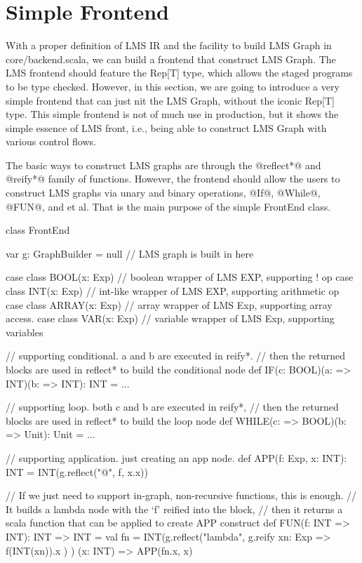 \section{Simple Frontend}\label{sec:s_front}

With a proper definition of LMS IR and the facility to build LMS Graph in core/backend.scala,
we can build a frontend that construct LMS Graph. The LMS frontend should feature the Rep[T]
type, which allows the staged programs to be type checked. However, in this section, we are
going to introduce a very simple frontend that can just nit the LMS Graph, without the iconic
Rep[T] type. This simple frontend is not of much use in production, but it shows the simple
essence of LMS front, i.e., being able to construct LMS Graph with various control flows.

The basic ways to construct LMS graphs are through the @reflect*@ and @reify*@ family of
functions. However, the frontend should allow the users to construct LMS graphs via unary
and binary operations, @If@, @While@, @FUN@, and et al. That is the main purpose of the
simple FrontEnd class.

\begin{listing}[scala]
class FrontEnd {

    var g: GraphBuilder = null // LMS graph is built in here

    case class BOOL(x: Exp) // boolean wrapper of LMS EXP, supporting ! op
    case class INT(x: Exp)  // int-like wrapper of LMS EXP, supporting arithmetic op
    case class ARRAY(x: Exp) // array wrapper of LMS Exp, supporting array access.
    case class VAR(x: Exp) // variable wrapper of LMS Exp, supporting variables

    // supporting conditional. a and b are executed in reify*.
    // then the returned blocks are used in reflect* to build the conditional node
    def IF(c: BOOL)(a: => INT)(b: => INT): INT = {...}

    // supporting loop. both c and b are executed in reify*,
    // then the returned blocks are used in reflect* to build the loop node
    def WHILE(c: => BOOL)(b: => Unit): Unit = {...}

    // supporting application. just creating an app node.
    def APP(f: Exp, x: INT): INT = INT(g.reflect("@", f, x.x))

    // If we just need to support in-graph, non-recursive functions, this is enough.
    // It builds a lambda node with the `f' reified into the block,
    // then it returns a scala function that can be applied to create APP construct
    def FUN(f: INT => INT): INT => INT = {
      val fn = INT(g.reflect("lambda", g.reify {xn: Exp => f(INT(xn)).x} ) )
      (x: INT) => APP(fn.x, x)
    }
}
\end{listing}

